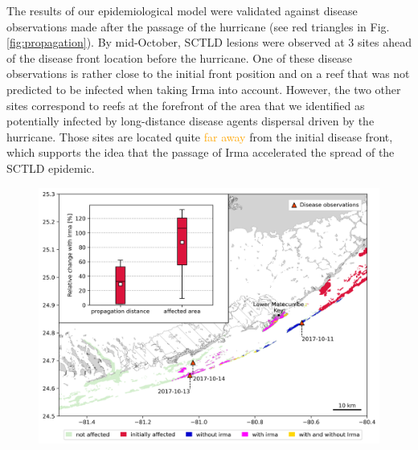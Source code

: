 \documentclass[fleqn,10pt]{wlscirep}
\newcommand{\modif}[1]{\textcolor{orange}{#1}}
\begin{document}
The results of our epidemiological model were validated against disease observations made after the passage of the hurricane (see red triangles in Fig. \ref{fig:propagation}). By mid-October, SCTLD lesions were observed at 3 sites ahead of the disease front location before the hurricane. One of these disease observations is rather close to the initial front position and on a reef that was not predicted to be infected when taking Irma into account. However, the two other sites correspond to reefs at the forefront of the area that we identified as potentially infected by long-distance disease agents dispersal driven by the hurricane. Those sites are located quite \modif{far away} from the initial disease front, which supports the idea that the passage of Irma accelerated the spread of the SCTLD epidemic.

\begin{figure}[tbp]
    \centering
    \includegraphics[width=.8\textwidth]{figures/propagation_boxplot_obs.png}
    \caption{
}
\end{figure}
\end{document}
